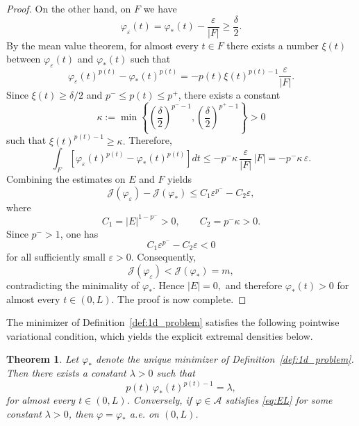 \documentclass[12pt]{amsart}
\numberwithin{equation}{section}
\theoremstyle{plain}
\newtheorem{theorem}[equation]{Theorem}
\theoremstyle{definition}
\begin{document}
\begin{proof}
On the other hand, on $F$ we have
\begin{equation*}
\varphi_\varepsilon(t)
=
\varphi_*(t)-\frac{\varepsilon}{|F|}
\ge\frac{\delta}{2}.
\end{equation*}
By the mean value theorem, for almost every $t\in F$ there exists a
number $\xi(t)$ between $\varphi_\varepsilon(t)$ and
$\varphi_*(t)$ such that
\begin{equation*}
\varphi_\varepsilon(t)^{p(t)}
-
\varphi_*(t)^{p(t)}
=
-
p(t)\xi(t)^{p(t)-1}
\frac{\varepsilon}{|F|}.
\end{equation*}
Since $\xi(t)\ge\delta/2$ and
$p^-\le p(t)\le p^+$, there exists a constant
\begin{equation*}
\kappa
:=
\min\left\{
\left(\frac{\delta}{2}\right)^{p^--1},
\left(\frac{\delta}{2}\right)^{p^+-1}
\right\}
>0
\end{equation*}
such that $\xi(t)^{p(t)-1}\ge\kappa.$
Therefore,
\begin{equation*}
\int_F
\left[
\varphi_\varepsilon(t)^{p(t)}
-
\varphi_*(t)^{p(t)}
\right]dt
\le
-
p^-\kappa\,\frac{\varepsilon}{|F|}\,|F|
=
-p^-\kappa\,\varepsilon.
\end{equation*}
Combining the estimates on $E$ and $F$ yields
\begin{equation*}
\mathcal J(\varphi_\varepsilon)
-
\mathcal J(\varphi_*)
\le
C_1\varepsilon^{p^-}
-
C_2\varepsilon,
\end{equation*}
where
\begin{equation*}
C_1=|E|^{1-p^-}>0,
\qquad
C_2=p^-\kappa>0.
\end{equation*}
Since $p^->1$, one has
\begin{equation*}
C_1\varepsilon^{p^-}-C_2\varepsilon<0
\end{equation*}
for all sufficiently small $\varepsilon>0$. Consequently,
\begin{equation*}
\mathcal J(\varphi_\varepsilon)
<
\mathcal J(\varphi_*)
=
m,
\end{equation*}
contradicting the minimality of $\varphi_*$. Hence
$|E|=0,$
and therefore $\varphi_*(t)>0$ for almost every $t\in(0,L)$.
The proof is now complete.
\end{proof}



The minimizer of Definition~\ref{def:1d_problem} satisfies the following
pointwise variational condition, which yields the explicit extremal
densities below.
\begin{theorem}
\label{thm:EL}
Let $\varphi_*$ denote the unique minimizer of
Definition~\ref{def:1d_problem}. Then there exists a constant
$\lambda>0$ such that
\begin{equation}
\label{eq:EL}
p(t)\,\varphi_*(t)^{p(t)-1}
=
\lambda,
\end{equation}
for almost every $t\in(0,L)$.
Conversely, if $\varphi\in\mathcal A$ satisfies
\eqref{eq:EL} for some constant $\lambda>0$, then $\varphi=\varphi_*$ a.e. on $(0,L)$.
\end{theorem}
\end{document}
